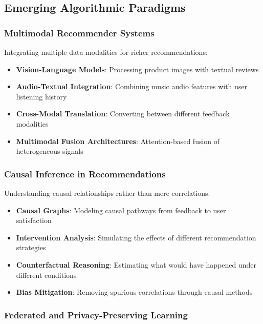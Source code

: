 \documentclass[acmsmall,review,anonymous]{acmart}
\begin{document}
\subsection{Emerging Algorithmic Paradigms}

\subsubsection{Multimodal Recommender Systems}

Integrating multiple data modalities for richer recommendations:

\begin{itemize}
    \item \textbf{Vision-Language Models}: Processing product images with textual reviews
    \item \textbf{Audio-Textual Integration}: Combining music audio features with user listening history
    \item \textbf{Cross-Modal Translation}: Converting between different feedback modalities
    \item \textbf{Multimodal Fusion Architectures}: Attention-based fusion of heterogeneous signals
\end{itemize}

\subsubsection{Causal Inference in Recommendations}

Understanding causal relationships rather than mere correlations:

\begin{itemize}
    \item \textbf{Causal Graphs}: Modeling causal pathways from feedback to user satisfaction
    \item \textbf{Intervention Analysis}: Simulating the effects of different recommendation strategies
    \item \textbf{Counterfactual Reasoning}: Estimating what would have happened under different conditions
    \item \textbf{Bias Mitigation}: Removing spurious correlations through causal methods
\end{itemize}

\subsubsection{Federated and Privacy-Preserving Learning}
\end{document}
